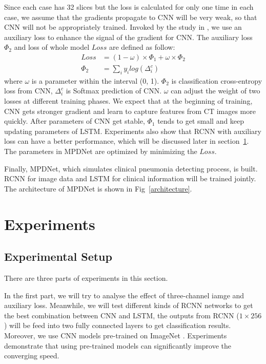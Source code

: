 \documentclass[journal]{IEEEtran}
\begin{document}
Since each case has 32 slices but the loss is calculated for only one time in each case, we assume that the gradients propagate to CNN will be very weak, so that CNN will not be appropriately trained. Invoked by the study in \cite{szegedy2016rethinking}, we use an auxiliary loss to enhance the signal of the gradient for CNN.
The auxiliary loss $\Phi_2$ and loss of whole model $Loss$ are defined as follow: 
\begin{align*}
Loss &=  (1 - \omega) \times \Phi_1 +  \omega \times \Phi_2 \\
\Phi_2 &= \sum_i{y_i log(\Delta^c_i)}
\end{align*}
where $\omega$ is a parameter within the interval (0, 1). $\Phi_2$ is classification cross-entropy loss from CNN, $\Delta^c_i$ is Softmax prediction of CNN. $\omega$ can adjust the weight of two losses at different training phases.
We expect that at the beginning of training, CNN gets stronger gradient and learn to capture features from CT images more quickly. After parameters of CNN get stable, $\Phi_1$ tends to get small and keep updating parameters of LSTM. Experiments also show that RCNN with auxiliary loss can have a better performance, which will be discussed later in section~\ref{experiments}. The parameters in MPDNet are optimized by minimizing the $Loss$.

Finally, MPDNet, which simulates clinical pneumonia detecting process, is built. RCNN for image data and LSTM for clinical information will be trained jointly. The architecture of MPDNet is shown in Fig~\ref{architecture}.


\section{Experiments}
\label{experiments}


\subsection{Experimental Setup}
\label{experimentalsetup}
There are three parts of experiments in this section.

In the first part, we will try to analyse the effect of three-channel iamge and auxiliary loss. Meanwhile, we will test different kinds of RCNN networks to get the best combination between CNN and LSTM, the outputs from RCNN ($1 \times 256$) will be feed into two fully connected layers to get classification results. 
Moreover, we use CNN models pre-trained on ImageNet \cite{ILSVRC15}. Experiments demonstrate that using pre-trained models can significantly improve the converging speed.
\end{document}
